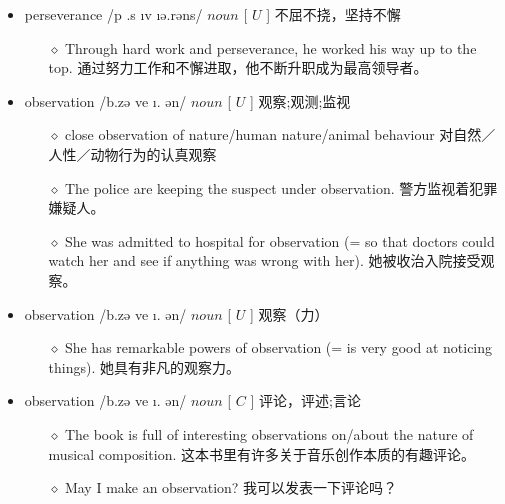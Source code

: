 \documentclass[a4paper,top=2.5cm,buttom=2.5cm10.5pt]{book}
\begin{document}
\begin{itemize}
\item perseverance /\textsecstress p \textrevepsilon  \textlengthmark .s \i  \textprimstress v \i ə.rəns/ $ noun $ [  $ U $  ] 不屈不挠，坚持不懈
\begin{itemize}
\item[$\diamond$] Through hard work and perseverance, he worked his way up to the top.
通过努力工作和不懈进取，他不断升职成为最高领导者。
\end{itemize}
\end{itemize}
\begin{itemize}
\item observation /\textsecstress  \textturnscripta b.zə \textprimstress ve \i . \textesh ən/ $ noun $ [  $ U $  ] 观察;观测;监视
\begin{itemize}
\item[$\diamond$] close observation of nature/human nature/animal behaviour
对自然／人性／动物行为的认真观察
\item[$\diamond$] The police are keeping the suspect under observation.
警方监视着犯罪嫌疑人。
\item[$\diamond$] She was admitted to hospital for observation (= so that doctors could watch her and see if anything was wrong with her).
她被收治入院接受观察。
\end{itemize}
\end{itemize}
\begin{itemize}
\item observation /\textsecstress  \textturnscripta b.zə \textprimstress ve \i . \textesh ən/ $ noun $ [  $ U $  ] 观察（力）
\begin{itemize}
\item[$\diamond$] She has remarkable powers of observation (= is very good at noticing things).
她具有非凡的观察力。
\end{itemize}
\end{itemize}
\begin{itemize}
\item observation /\textsecstress  \textturnscripta b.zə \textprimstress ve \i . \textesh ən/ $ noun $ [  $ C $  ] 评论，评述;言论
\begin{itemize}
\item[$\diamond$] The book is full of interesting observations on/about the nature of musical composition.
这本书里有许多关于音乐创作本质的有趣评论。
\item[$\diamond$] May I make an observation?
我可以发表一下评论吗？
\end{itemize}
\end{itemize}
\end{document}
